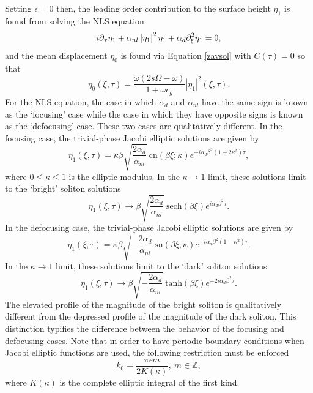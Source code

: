 \documentclass{JFM_Style/jfm}
\begin{document}
Setting $\epsilon=0$ then, the leading order contribution to the surface height $\eta_{1}$ is found from solving the NLS equation
\[
i\partial_{\tau}\eta_{1} + \alpha_{nl}\left|\eta_{1}\right|^{2}\eta_{1} + \alpha_{d}\partial_{\xi}^{2}\eta_{1} = 0,
\]
and the mean displacement $\eta_{0}$ is found via Equation \eqref{zavsol} with $C(\tau)=0$ so that
\begin{equation}
\eta_{0}(\xi,\tau) = \frac{\omega(2s\Omega-\omega)}{1+\omega c_{g}}\left|\eta_{1}\right|^{2}(\xi,\tau).
\label{meansurf}
\end{equation}
For the NLS equation, the case in which $\alpha_{d}$ and $\alpha_{nl}$ have the same sign is known as the `focusing' case while the case in which they have opposite signs is known as the `defocusing' case.  These two cases are qualitatively different.  In the focusing case, the trivial-phase Jacobi elliptic solutions are given by
\begin{equation}
\eta_{1}(\xi,\tau) = \kappa\beta \sqrt{\frac{2\alpha_{d}}{\alpha_{nl}}}~\mbox{cn}(\beta \xi;\kappa)e^{-i\alpha_{d}\beta^{2}(1-2\kappa^2)\tau},
\label{cnsolns}
\end{equation}
where $0\le\kappa\le1$ is the elliptic modulus.  In the $\kappa \rightarrow 1$ limit, these solutions limit to the `bright' soliton solutions
\[
\eta_{1}(\xi,\tau) \rightarrow \beta \sqrt{\frac{2\alpha_{d}}{\alpha_{nl}}}~\mbox{sech}(\beta \xi)e^{i\alpha_{d}\beta^{2}\tau}.
\]
In the defocusing case, the trivial-phase Jacobi elliptic solutions are given by 
\begin{equation}
\eta_{1}(\xi,\tau) = \kappa\beta \sqrt{-\frac{2\alpha_{d}}{\alpha_{nl}}}~\mbox{sn}(\beta \xi;\kappa) e^{-i\alpha_{d}\beta^{2}(1+\kappa^2)\tau}.
\label{snsolns}
\end{equation}
In the $\kappa\rightarrow1$ limit, these solutions limit to the `dark'
soliton solutions
\[
\eta_{1}(\xi,\tau) \rightarrow \beta \sqrt{-\frac{2\alpha_{d}}{\alpha_{nl}}}~ \mbox{tanh}(\beta \xi)  e^{-2i\alpha_{d}\beta^{2}\tau}.
\] 
The elevated profile of the magnitude of the bright soliton is qualitatively different from the depressed profile of the magnitude of the dark soliton.  This distinction typifies the difference between the behavior of the focusing and defocusing cases.  Note that in order to have periodic boundary conditions when Jacobi elliptic functions are used, the following restriction must be enforced
\begin{equation}
k_{0} = \frac{\pi \epsilon m}{2K(\kappa)},~ m\in \mathbb{Z},
\label{jacwavnum}
\end{equation}
where $K(\kappa)$ is the complete elliptic integral of the first kind.   
\end{document}
